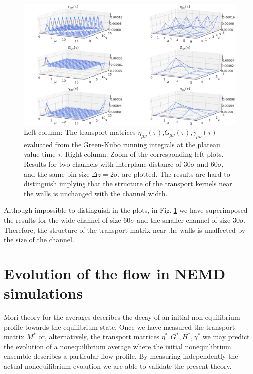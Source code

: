 \documentclass[b5paper,openright,10pt]{book}
\begin{document}
\begin{figure}[]
\includegraphics[width=\linewidth]{Etatau-matrix-17nodes-WALLS}
\caption[The transport matrices evaluated from the Green-Kubo running integrals at the plateau value time for a confined fluid - Thick bins]{Left column: The                     transport                    matrices
  $\eta_{\mu\nu}(\tau)$,$G_{\mu\nu}(\tau)$,$\gamma_{\mu\nu}(\tau)$
  evaluated from the Green-Kubo running integrals at the plateau value
  time $\tau$. Right column: Zoom  of  the corresponding left plots.  Results  for  two channels  with
  interplane distance of  $30\sigma$ and $60\sigma$, and  the same bin
  size  $\Delta  z=2\sigma$, are  plotted.  The  results are  hard  to
  distinguish implying that the structure of the transport kernels near
  the walls is unchanged with the channel width.}
\label{Fig-GK-zoom}
\end{figure}

Although   impossible   to  distinguish   in   the   plots,  in   Fig.
\ref{Fig-GK-zoom}  we  have  superimposed  the results  for  the  wide
channel  of   size  60$\sigma$  and   the  smaller  channel   of  size
30$\sigma$. Therefore, the structure of  the transport matrix near the
walls is unaffected by the size of the channel.


\section{Evolution of the flow in NEMD simulations}

Mori theory for the averages describes the decay of an initial non-equilibrium
profile towards the equilibrium state.
Once we  have measured the  transport matrix $M^*$  or, alternatively,
the transport  matrices $\eta^*,G^*,H^*,\gamma^*$  we may  predict the
evolution   of   a   nonequilibrium   average   where   the   initial
nonequilibrium  ensemble describes  a  particular  flow profile.   By
measuring independently  the actual  nonequilibrium evolution  we are
able to validate the present theory.
\end{document}
